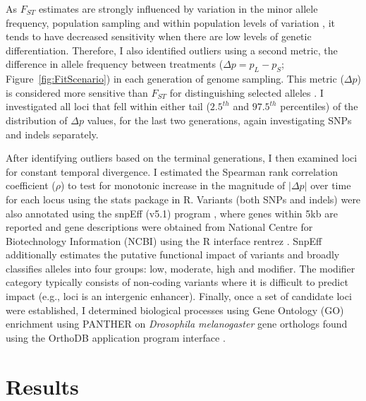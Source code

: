  As $F_{ST}$ estimates are strongly influenced by variation in the minor allele frequency, population sampling and within population levels of variation \citep{Char98}, it tends to have decreased sensitivity when there are low levels of genetic differentiation. Therefore, I also identified outliers using a second metric, the difference in allele frequency between treatments ($\Delta p = p_{L}-p_{S}$; Figure~\ref{fig:FitScenario}) in each generation of genome sampling. This metric ($\Delta p$) is considered more sensitive than $F_{ST}$ for distinguishing selected alleles \cite{Gros10, Bern19}. I investigated all loci that fell within either tail ($2.5^{th}$ and $97.5^{th}$ percentiles) of the distribution of $\Delta p$ values, for the last two generations, again investigating SNPs and indels separately.\par 

After identifying outliers based on the terminal generations, I then examined loci for constant temporal divergence. I estimated the Spearman rank correlation coefficient ($\rho$) to test for monotonic increase in the magnitude of $|\Delta p|$ over time for each locus using the stats package in R. Variants (both SNPs and indels) were also annotated using the snpEff (v5.1) program \citep{Cing12}, where genes within 5kb are reported and gene descriptions were obtained from National Centre for Biotechnology Information (NCBI) using the R interface rentrez \citep[v1.2.3,][]{Wint17}. SnpEff additionally estimates the putative functional impact of variants and broadly classifies alleles into four groups: low, moderate, high and modifier. The modifier category typically consists of non-coding variants where it is difficult to predict impact (e.g., loci is an intergenic enhancer). Finally, once a set of candidate loci were established, I determined biological processes using Gene Ontology (GO) enrichment using PANTHER \citep[v17,][]{Thom22} on \textit{Drosophila melanogaster} gene orthologs found using the OrthoDB application program interface \citep{Kuzn22}.\par 

\section{Results}
